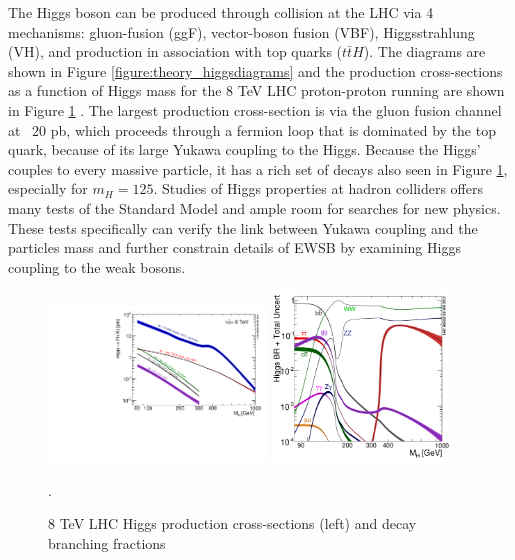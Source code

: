 The Higgs boson can be produced through collision at the LHC
via 4 mechanisms: gluon-fusion (ggF), vector-boson fusion (VBF), 
Higgsstrahlung (VH), and production in association with top quarks ($t\bar{t}H$). The diagrams
are shown in Figure \ref{figure:theory_higgsdiagrams} and the production
cross-sections as a function of Higgs mass for the 8 TeV LHC proton-proton
running are shown in Figure \ref{figure:theory_xsec} \cite{Dittmaier:2012vm}. The largest production
cross-section is via the gluon fusion channel at ~$20$ pb, which proceeds
through a fermion loop that is dominated by the top quark, because of its
large Yukawa coupling to the Higgs. Because the Higgs' couples to every massive
particle, it has a rich set of decays also seen in Figure
\ref{figure:theory_xsec}, especially for $m_H=125$.  Studies of Higgs
properties at hadron colliders offers many tests of the Standard Model
and ample room for searches for new physics. These
tests specifically can verify the link between Yukawa coupling and the
particles mass and further constrain details of EWSB by examining Higgs coupling
to the weak bosons. 

\begin{figure}[!t]
\centering 
\includegraphics[width=0.52\textwidth]{figs/Higgs_XS_8TeV_lx.pdf}
\includegraphics[width=0.42\textwidth]{figs/Higgs_BR.pdf}
\caption {8 TeV LHC Higgs production cross-sections (left) and decay branching fractions }.
\label{figure:theory_xsec}
\end{figure}


